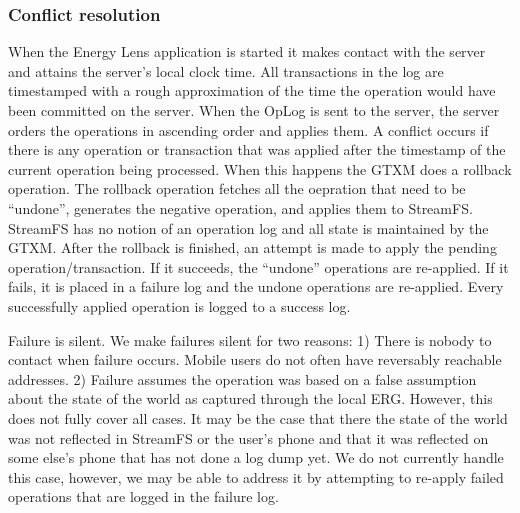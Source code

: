 \subsubsection{Conflict resolution}
\label{sec:conflicts}
When the Energy Lens application is started it makes contact with the server and attains the server's local clock time. 
All transactions in the log are timestamped with a rough approximation of the time the operation would have been committed on the server. 
When the OpLog is sent to the server, the server orders the operations in ascending order and applies them.
A conflict occurs if there is any operation or transaction that was applied after the timestamp of the current operation
being processed.  When this happens the GTXM does a rollback operation.  The rollback operation
fetches all the oepration that need to be ``undone'', generates the negative operation, and applies them to StreamFS.
StreamFS has no notion of an operation log and all state is maintained by the GTXM.  After the rollback is finished, 
an attempt is made to apply the pending operation/transaction.  If it succeeds, the ``undone'' operations are re-applied.
If it fails, it is placed in a failure log and the undone operations are re-applied.  Every successfully applied operation is logged
to a success log.

Failure is silent.  We make failures silent for two reasons: 1) There is nobody to contact when failure occurs.  Mobile
users do not often have reversably reachable addresses.  2) Failure assumes the operation was based on a false assumption about the state
of the world as captured through the local ERG.  However, this does not fully cover all cases.  It may be the case that
there the state of the world was not reflected in StreamFS or the user's phone and that it was reflected on some else's phone that
has not done a log dump yet.  We do not currently handle this case, however, we may be able to address it by attempting to re-apply
failed operations that are logged in the failure log.




